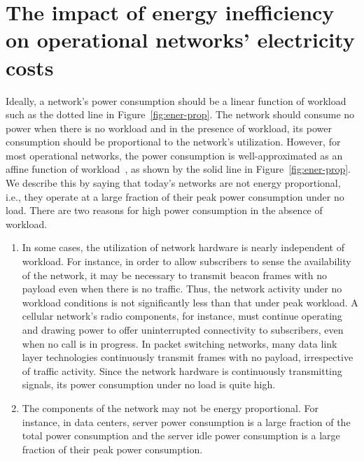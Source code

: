 \section{The impact of energy inefficiency on operational networks' electricity costs} 

Ideally, a network's power consumption should be a linear function of workload such as the dotted line in Figure~\ref{fig:ener-prop}. The network should consume no power when there is no workload and in the presence of workload, its power consumption should be proportional to the network's utilization. However, for most operational networks, the power consumption is well-approximated as an affine function of workload~\cite{Peng:2011:TPS:2030613.2030628,Fan:power:ICSA:2007}, as shown by the solid line in Figure~\ref{fig:ener-prop}. We describe this by saying that today's networks are not energy proportional, i.e., they operate at a large fraction of their peak power consumption under no load. There are two reasons for high power consumption in the absence of workload. 
\begin{enumerate}
\item In some cases, the utilization of network hardware is nearly independent of workload. For instance, in order to allow subscribers to sense the availability of the network, it may be necessary to transmit beacon frames with no payload even when there is no traffic. Thus, the network activity under no workload conditions is not significantly less than that under peak workload. A cellular network's radio components, for instance, must continue operating and drawing power to offer uninterrupted connectivity to subscribers, even when no call is in progress. In packet switching networks, many data link layer technologies continuously transmit frames with no payload, irrespective of traffic activity. Since the network hardware is continuously transmitting signals, its power consumption under no load is quite high.
\item The components of the network may not be energy proportional. For instance, in data centers, server power consumption is a large fraction of the total power consumption and the server idle power consumption is a large fraction of their peak power consumption. 
\end{enumerate}

